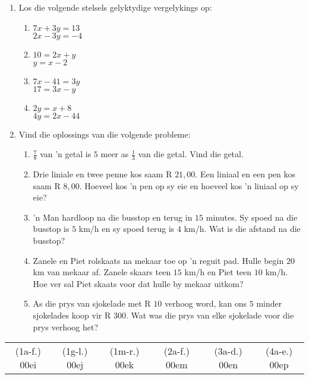 \begin{eocexercises}{}
\begin{enumerate}[itemsep=5pt, label=\textbf{\arabic*}. ]
\item Los die volgende stelsels gelyktydige vergelykings op:

\begin{enumerate}[itemsep=5pt,label=\textbf{(\alph*)}]
\item $7x+3y=13$\\$2x-3y=-4$  
\item $10=2x+y$\\$y=x-2$
\item $7x-41=3y$\\$17=3x-y$
\item $2y=x+8$\\$4y=2x-44$
\end{enumerate}

\item Vind die oplossings van die volgende probleme:

\begin{enumerate}[itemsep=5pt,label=\textbf{(\alph*)}]
\item $\frac{7}{8}$ van ’n getal is $5$ meer as $\frac{1}{3}$ van die getal. Vind die getal.

\item Drie liniale en twee penne kos saam R $21,00$. Een liniaal en een pen kos saam R
$8,00$. Hoeveel kos ’n pen op sy eie en hoeveel kos ’n liniaal op sy eie?

\item ’n Man hardloop na die busstop en terug in $15$ minutes. Sy spoed na die busstop is
$5$ km/h en sy spoed terug is $4$ km/h. Wat is die afstand na die busstop?
\item Zanele en Piet rolskaats na mekaar toe op ’n reguit pad. Hulle begin $20$ km van
mekaar af. Zanele skaars teen $15$ km/h en Piet teen $10$ km/h. Hoe ver sal Piet skaats
voor dat hulle by mekaar uitkom?

\item As die prys van sjokelade met R $10$ verhoog word, kan ons $5$ minder sjokelades
koop vir R $300$. Wat was die prys van elke sjokelade voor die prys verhoog het?

   

\end{enumerate}
\end{enumerate}
\practiceinfo
\par 
\par \begin{tabular}[h]{cccccc} 
(1a-f.) 00ei&  (1g-l.) 00ej& (1m-r.) 00ek&  (2a-f.) 00em&  (3a-d.) 00en&  (4a-e.) 00ep\end{tabular}

\end{eocexercises}